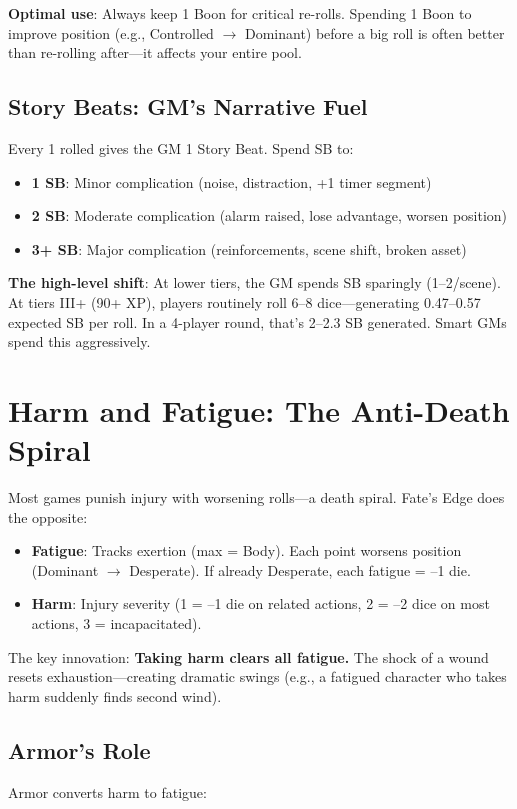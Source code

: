 \documentclass[11pt]{article}
\begin{document}
\textbf{Optimal use}: Always keep 1 Boon for critical re-rolls. Spending 1 Boon to improve position (e.g., Controlled $\rightarrow$ Dominant) before a big roll is often better than re-rolling after---it affects your entire pool.

\subsection{Story Beats: GM's Narrative Fuel}
Every 1 rolled gives the GM 1 Story Beat. Spend SB to:
\begin{itemize}
    \item \textbf{1 SB}: Minor complication (noise, distraction, +1 timer segment)
    \item \textbf{2 SB}: Moderate complication (alarm raised, lose advantage, worsen position)
    \item \textbf{3+ SB}: Major complication (reinforcements, scene shift, broken asset)
\end{itemize}

\textbf{The high-level shift}: At lower tiers, the GM spends SB sparingly (1--2/scene). At tiers III+ (90+ XP), players routinely roll 6--8 dice---generating 0.47--0.57 expected SB per roll. In a 4-player round, that's 2--2.3 SB generated. Smart GMs spend this aggressively.

\section{Harm and Fatigue: The Anti-Death Spiral}

Most games punish injury with worsening rolls---a death spiral. Fate's Edge does the opposite:
\begin{itemize}
    \item \textbf{Fatigue}: Tracks exertion (max = Body). Each point worsens position (Dominant $\rightarrow$ Desperate). If already Desperate, each fatigue = --1 die.
    \item \textbf{Harm}: Injury severity (1 = --1 die on related actions, 2 = --2 dice on most actions, 3 = incapacitated).
\end{itemize}

The key innovation: \textbf{Taking harm clears all fatigue.} The shock of a wound resets exhaustion---creating dramatic swings (e.g., a fatigued character who takes harm suddenly finds second wind).

\subsection{Armor's Role}
Armor converts harm to fatigue:
\end{document}
